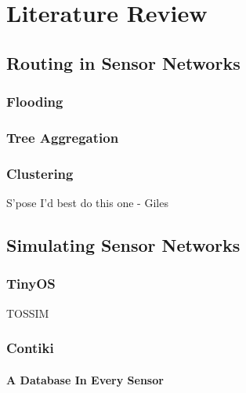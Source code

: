 \section{Literature Review}

\subsection{Routing in Sensor Networks}

\cite{TankBible}
\cite{Akkaya2005325}

\cite{aggphdfeng} %

\subsubsection*{Flooding}

\subsubsection*{Tree Aggregation}
\cite{1628365} %

\subsubsection*{Clustering}

S'pose I'd best do this one - Giles
\cite{LEACH}\cite{placement}\cite{SECC}\cite{EEMC}

\subsection{Simulating Sensor Networks}

\subsubsection*{TinyOS}

TOSSIM \cite{levis2003tossim}

\subsubsection*{Contiki}

\paragraph{A Database In Every Sensor} 
\cite{Tsiftes:2011:DS:2070942.2070974} %
\cite{TinyDB}

